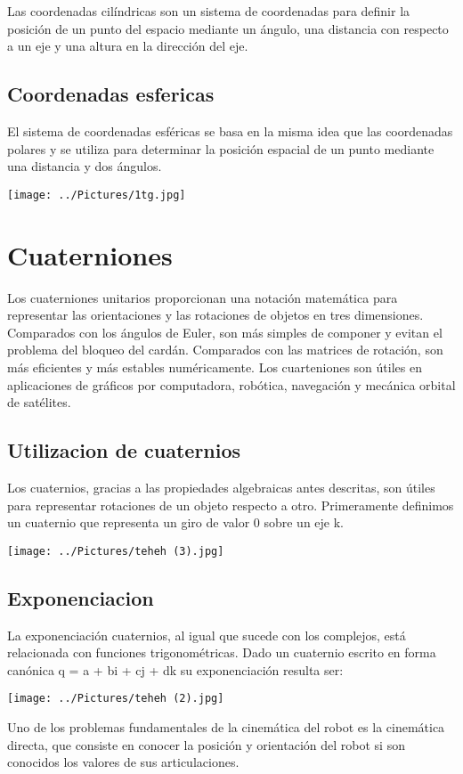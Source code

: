 \documentclass[10pt,a4paper]{article}
\begin{document}
Las coordenadas cilíndricas son un sistema de coordenadas para definir la posición de un punto del espacio mediante un ángulo, una distancia con respecto a un eje y una altura en la dirección del eje.
\subsection{Coordenadas esfericas}
El sistema de coordenadas esféricas se basa en la misma idea que las coordenadas polares y se utiliza para determinar la posición espacial de un punto mediante una distancia y dos ángulos.

\texttt{[image: ../Pictures/1tg.jpg]} 
\section{Cuaterniones}
Los cuaterniones unitarios proporcionan una notación matemática para representar las orientaciones y las rotaciones de objetos en tres dimensiones. Comparados con los ángulos de Euler, son más simples de componer y evitan el problema del bloqueo del cardán. Comparados con las matrices de rotación, son más eficientes y más estables numéricamente. Los cuarteniones son útiles en aplicaciones de gráficos por computadora, robótica, navegación y mecánica orbital de satélites.
\subsection{Utilizacion de cuaternios}
Los cuaternios, gracias a las propiedades algebraicas antes descritas, son útiles para representar rotaciones de un objeto respecto a otro. Primeramente definimos un cuaternio que representa un giro de valor 0 sobre un eje k.






\texttt{[image: ../Pictures/teheh (3).jpg]} 
\subsection{Exponenciacion}
La exponenciación cuaternios, al igual que sucede con los complejos, está relacionada con funciones trigonométricas. Dado un cuaternio escrito en forma canónica q = a + bi + cj + dk su exponenciación resulta ser:

\texttt{[image: ../Pictures/teheh (2).jpg]} 

Uno de los problemas fundamentales de la cinemática del robot es la cinemática directa, que consiste en conocer la posición y orientación del robot si son conocidos los valores de sus articulaciones.
\end{document}
